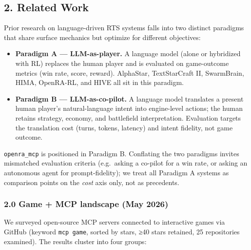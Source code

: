 \documentclass[
  journal]{IEEEtran}
\providecommand{\tightlist}{%
  \setlength{\itemsep}{0pt}\setlength{\parskip}{0pt}}
\begin{document}
\subsection{2. Related Work}\label{related-work}

Prior research on language-driven RTS systems falls into two distinct
paradigms that share surface mechanics but optimize for different
objectives:

\begin{itemize}
\tightlist
\item
  \textbf{Paradigm A --- LLM-as-player.} A language model (alone or
  hybridized with RL) replaces the human player and is evaluated on
  game-outcome metrics (win rate, score, reward). AlphaStar,
  TextStarCraft II, SwarmBrain, HIMA, OpenRA-RL, and HIVE all sit in
  this paradigm.
\item
  \textbf{Paradigm B --- LLM-as-co-pilot.} A language model translates a
  present human player's natural-language intent into engine-level
  actions; the human retains strategy, economy, and battlefield
  interpretation. Evaluation targets the translation cost (turns,
  tokens, latency) and intent fidelity, not game outcome.
\end{itemize}

\texttt{openra\_mcp} is positioned in Paradigm B. Conflating the two
paradigms invites mismatched evaluation criteria (e.g.~asking a co-pilot
for a win rate, or asking an autonomous agent for prompt-fidelity); we
treat all Paradigm A systems as comparison points on the \emph{cost}
axis only, not as precedents.

\subsubsection{2.0 Game + MCP landscape (May
2026)}\label{game-mcp-landscape-may-2026}

We surveyed open-source MCP servers connected to interactive games via
GitHub (keyword \texttt{mcp\ game}, sorted by stars, ≥40 stars retained,
25 repositories examined). The results cluster into four groups:
\end{document}
